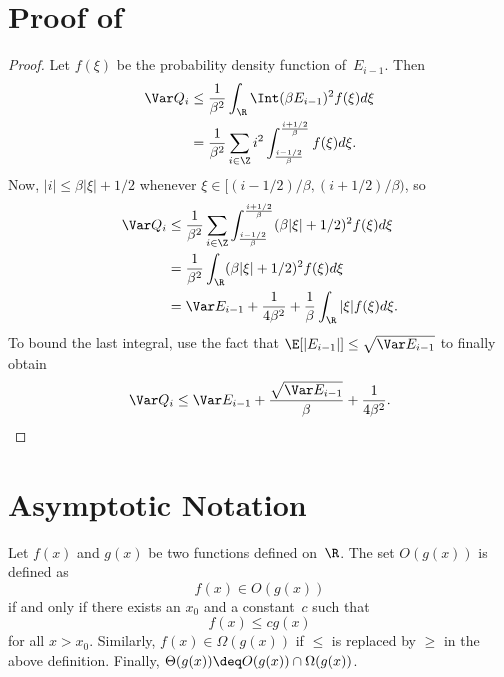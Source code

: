 \begin{subappendices}


\section{Proof of }\label{app:qvarboundproof}

\begin{proof}
  Let $f(\xi)$ be the probability density function of~$E_{i-1}$. Then
  \begin{align*}
    \Var Q_i &\le \frac{1}{\beta^2} \int_{\R} \Int(\beta E_{i-1})^2 f(\xi) d\xi
    \\
    &= \frac{1}{\beta^2} \sum_{i\in\Z} i^2
    \int_{\frac{i-1/2}{\beta}}^{\frac{i+1/2}{\beta}} f(\xi) d\xi.
  \end{align*}
  Now, $|i| \le \beta|\xi| + 1/2$ whenever $\xi \in [(i-1/2)/\beta,
  (i+1/2)/\beta)$, so
  \begin{align*}
    \Var Q_i &\le \frac{1}{\beta^2} \sum_{i\in \Z}
    \int_{\frac{i-1/2}{\beta}}^{\frac{i+1/2}{\beta}} (\beta|\xi| + 1/2)^2 
    f(\xi) d\xi \\
    &= \frac{1}{\beta^2} \int_{\R} (\beta|\xi| + 1/2)^2 f(\xi) d\xi \\
    &= \Var E_{i-1} + \frac{1}{4\beta^2} + \frac{1}{\beta} \int_{\R} |\xi|
    f(\xi)d\xi.
  \end{align*}
  To bound the last integral, use the fact that $\E[|E_{i-1}|] \le \sqrt{\Var
  E_{i-1}}$ to finally obtain
  \begin{equation*}
    \Var Q_i \le \Var E_{i-1} + \frac{\sqrt{\Var E_{i-1}}}{\beta} +
    \frac{1}{4\beta^2}.
  \end{equation*}
\end{proof}
  

  \section{Asymptotic Notation}\label{app:asymptotic}

  \begin{definition}
    \label{def:bigo}
    Let $f(x)$ and $g(x)$ be two functions defined on~$\R$. The set $O(g(x))$ is
    defined as
    \begin{equation*}
      f(x) \in O(g(x))
    \end{equation*}
    if and only if there exists an $x_0$ and a constant~$c$ such that
    \begin{equation*}
      f(x) \le c g(x)
    \end{equation*}
    for all $x > x_0$. 
    Similarly, $f(x) \in \Omega(g(x))$ if $\le$ is replaced by $\ge$ in
    the above definition. Finally, $\Theta(g(x)) \deq O(g(x)) \cap
    \Omega(g(x))$.
  \end{definition}



\end{subappendices}
